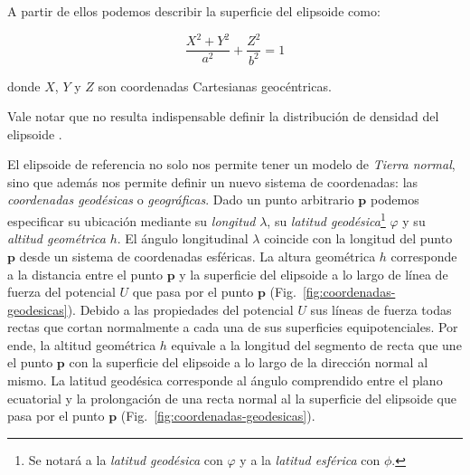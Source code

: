 \noindent A partir de ellos podemos describir la superficie del elipsoide como:

\begin{equation}
    \frac{X^2 + Y^2}{a^2} + \frac{Z^2}{b^2} = 1
\end{equation}

\noindent donde $X$, $Y$ y $Z$ son coordenadas Cartesianas geocéntricas.

Vale notar que no resulta indispensable definir la distribución de densidad del
elipsoide \citep[][p.~64]{heiskanen1967}.

El elipsoide de referencia no solo nos permite tener un modelo de \emph{Tierra
normal}, sino que además nos permite definir un nuevo sistema de coordenadas:
las \emph{coordenadas geodésicas} o \emph{geográficas}.
Dado un punto arbitrario $\mathbf{p}$ podemos especificar su ubicación mediante
su \emph{longitud} $\lambda$, su
\emph{latitud geodésica}\footnote{%
    Se notará a la \emph{latitud geodésica} con $\varphi$ y a la \emph{latitud
    esférica} con $\phi$.
}
$\varphi$ y su \emph{altitud geométrica} $h$.
El ángulo longitudinal $\lambda$ coincide con la longitud del punto
$\mathbf{p}$ desde un sistema de coordenadas esféricas.
La altura geométrica $h$ corresponde a la distancia entre el punto $\mathbf{p}$
y la superficie del elipsoide a lo largo de línea de fuerza del potencial $U$
que pasa por el punto $\mathbf{p}$ (Fig.~\ref{fig:coordenadas-geodesicas}).
Debido a las propiedades del potencial $U$ sus líneas de fuerza todas
rectas que cortan normalmente a cada una de sus superficies equipotenciales.
Por ende, la altitud geométrica $h$ equivale a la longitud del segmento de
recta que une el punto $\mathbf{p}$ con la superficie del elipsoide a lo largo
de la dirección normal al mismo.
La latitud geodésica corresponde al ángulo comprendido entre el plano
ecuatorial y la prolongación de una recta normal al la superficie del elipsoide
que pasa por el punto $\mathbf{p}$ (Fig.~\ref{fig:coordenadas-geodesicas}).

